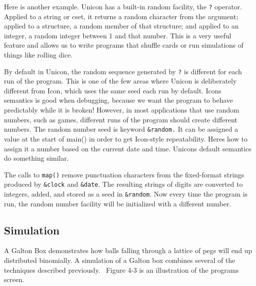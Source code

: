
Here is another example. Unicon has a built-in random facility, the
\texttt{?} operator. Applied to a string or cset, it returns a random
character from the argument; applied to a structure, a random member of
that structure; and applied to an integer, a random integer between 1
and that number. This is a very useful feature and allows us to write
programs that shuffle cards or run simulations of things like rolling
dice.

By default in Unicon, the random sequence generated by \texttt{?} is
different for each run of the program. This is one of the few areas
where Unicon is deliberately different from Icon, which uses the same
seed each run by default. Icon{\textquotesingle}s semantics is good
when debugging, because we want the program to behave predictably while
it is broken! However, in most applications that use random numbers,
such as games, different runs of the program should create different
numbers. The random number seed is keyword
\texttt{\&random.} It can be assigned a value at the start of main() in
order to get Icon-style repeatability. Here{\textquotesingle}s how to
assign it a number based on the current date and time.
Unicon{\textquotesingle}s default semantics do something similar.


\noindent
The calls to \texttt{map()} remove punctuation characters from the
fixed-format strings produced by \texttt{\&clock} and \texttt{\&date}.
The resulting strings of digits are converted to integers, added, and
stored as a seed in \texttt{\&random}. Now every time the program is
run, the random number facility will be initialized with a different
number.

\subsection{Simulation}

A Galton Box demonstrates how balls falling through a
lattice of pegs will end up distributed binomially. A simulation of a
Galton box combines several of the techniques described previously.
\ Figure 4-3 is an illustration of the program{\textquotesingle}s
screen.



